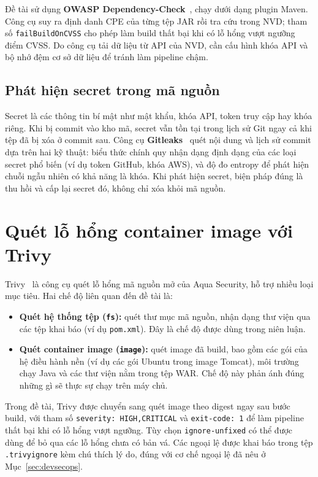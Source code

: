 \documentclass[12pt,a4paper,oneside]{extreport}
\begin{document}
Đề tài sử dụng \textbf{OWASP Dependency-Check}~\cite{dependency-check}, chạy dưới
dạng plugin Maven. Công cụ suy ra định danh CPE của từng tệp JAR rồi tra cứu
trong NVD; tham số \texttt{failBuildOnCVSS} cho phép làm build thất bại khi có
lỗ hổng vượt ngưỡng điểm CVSS. Do công cụ tải dữ liệu từ API của NVD, cần cấu
hình khóa API và bộ nhớ đệm cơ sở dữ liệu để tránh làm pipeline chậm.

\subsection{Phát hiện secret trong mã nguồn}
Secret là các thông tin bí mật như mật khẩu, khóa API, token truy cập hay khóa
riêng. Khi bị commit vào kho mã, secret vẫn tồn tại trong lịch sử Git ngay cả
khi tệp đã bị xóa ở commit sau. Công cụ \textbf{Gitleaks}~\cite{gitleaks} quét
nội dung và lịch sử commit dựa trên hai kỹ thuật: biểu thức chính quy nhận dạng
định dạng của các loại secret phổ biến (ví dụ token GitHub, khóa AWS), và độ đo
entropy để phát hiện chuỗi ngẫu nhiên có khả năng là khóa. Khi phát hiện secret,
biện pháp đúng là thu hồi và cấp lại secret đó, không chỉ xóa khỏi mã nguồn.

\section{Quét lỗ hổng container image với Trivy}
\label{sec:trivy}
Trivy~\cite{trivy} là công cụ quét lỗ hổng mã nguồn mở của Aqua Security, hỗ trợ
nhiều loại mục tiêu. Hai chế độ liên quan đến đề tài là:
\begin{itemize}
  \item \textbf{Quét hệ thống tệp (\texttt{fs}):} quét thư mục mã nguồn, nhận dạng
  thư viện qua các tệp khai báo (ví dụ \texttt{pom.xml}). Đây là chế độ được dùng
  trong niên luận.
  \item \textbf{Quét container image (\texttt{image}):} quét image đã build, bao gồm
  các gói của hệ điều hành nền (ví dụ các gói Ubuntu trong image Tomcat), môi
  trường chạy Java và các thư viện nằm trong tệp WAR. Chế độ này phản ánh đúng
  những gì sẽ thực sự chạy trên máy chủ.
\end{itemize}

Trong đề tài, Trivy được chuyển sang quét image theo digest ngay sau bước build,
với tham số \texttt{severity: HIGH,CRITICAL} và \texttt{exit-code: 1} để làm
pipeline thất bại khi có lỗ hổng vượt ngưỡng. Tùy chọn
\texttt{ignore-unfixed} có thể được dùng để bỏ qua các lỗ hổng chưa có bản vá.
Các ngoại lệ được khai báo trong tệp \texttt{.trivyignore} kèm chú thích lý do,
đúng với cơ chế ngoại lệ đã nêu ở Mục~\ref{sec:devsecops}.
\end{document}
